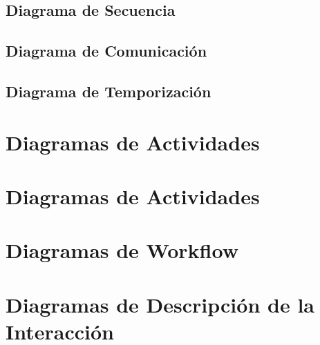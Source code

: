 \newpage

\subsection{Diagrama de Secuencia}

\newpage

\subsection{Diagrama de Comunicación}

\newpage

\subsection{Diagrama de Temporización}

\newpage

\section{Diagramas de Actividades}

\newpage

\section{Diagramas de Actividades}

\newpage

\section{Diagramas de Workflow}

\newpage

\section{Diagramas de Descripción de la Interacción}

\newpage